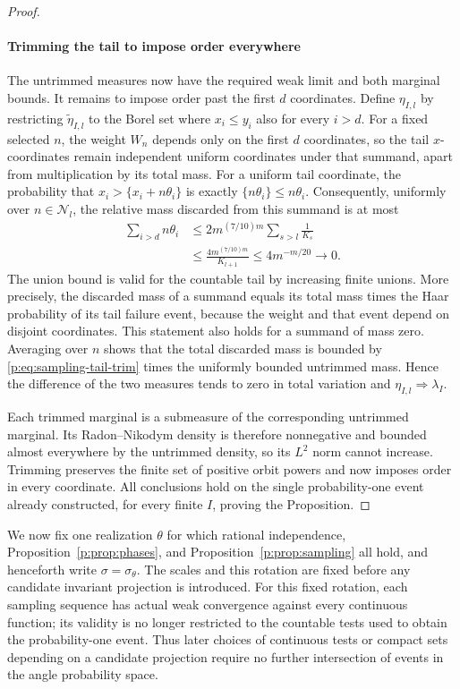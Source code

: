 \begin{proof}
\paragraph{Trimming the tail to impose order everywhere}

The untrimmed measures now have the required weak limit and both
marginal bounds.  It remains to impose order past the first $d$
coordinates.  Define
$\eta_{I,l}$ by restricting $\widetilde\eta_{I,l}$ to the Borel
set where $x_i\le y_i$ also for every $i>d$.  For a fixed selected
$n$, the weight $W_n$ depends only on the first $d$ coordinates,
so the tail $x$-coordinates remain independent uniform coordinates
under that summand, apart from multiplication by its total mass.
For a uniform tail coordinate, the probability that
$x_i>\{x_i+n\theta_i\}$ is exactly $\{n\theta_i\}\le n\theta_i$.
Consequently, uniformly over $n\in\mathcal N_l$, the relative mass
discarded from this summand is at most
\begin{equation}\label{p:eq:sampling-tail-trim}
 \begin{split}
 \sum_{i>d}n\theta_i
 &\le 2m^{(7/10)m}\sum_{s>l}\frac1{K_s}\\
 &\le\frac{4m^{(7/10)m}}{K_{l+1}}
 \le4m^{-m/20}\longrightarrow0.
 \end{split}
\end{equation}
The union bound is valid for the countable tail by increasing
finite unions.  More precisely, the discarded mass of a summand
equals its total mass times the Haar probability of its tail
failure event, because the weight and that event depend on disjoint
coordinates.  This statement also holds for a summand of mass zero.
Averaging over $n$ shows that the total discarded mass is bounded
by \eqref{p:eq:sampling-tail-trim} times the uniformly bounded
untrimmed mass.  Hence the difference of the two measures tends
to zero in total variation and
$\eta_{I,l}\Longrightarrow\lambda_I$.

Each trimmed marginal is a submeasure of the corresponding
untrimmed marginal.  Its Radon--Nikodym density is therefore
nonnegative and bounded almost everywhere by the untrimmed density,
so its $L^2$ norm cannot increase.  Trimming preserves the finite
set of positive orbit powers and now imposes order in every
coordinate.  All conclusions hold on the single probability-one
event already constructed, for every finite $I$, proving the
Proposition.
\end{proof}

We now fix one realization $\theta$ for which rational independence,
Proposition~\ref{p:prop:phases}, and Proposition~\ref{p:prop:sampling}
all hold, and henceforth write $\sigma=\sigma_\theta$.  The scales
and this rotation are fixed before any candidate invariant
projection is introduced.  For this fixed rotation, each sampling
sequence has actual weak convergence against every continuous
function; its validity is no longer restricted to the countable
tests used to obtain the probability-one event.  Thus later choices
of continuous tests or compact sets depending on a candidate
projection require no further intersection of events in the angle
probability space.

